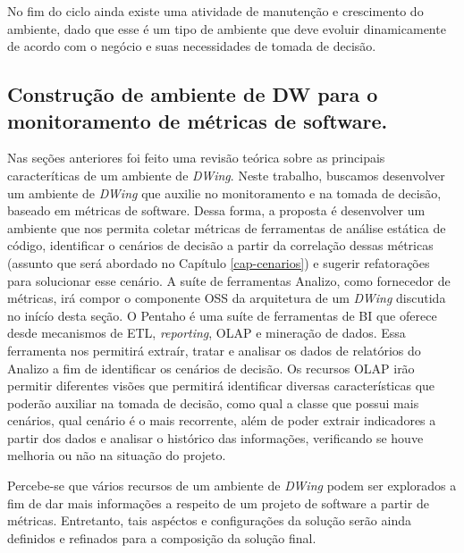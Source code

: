 No fim do ciclo ainda existe uma atividade de manutenção e crescimento do ambiente, dado que esse é um tipo de ambiente que deve evoluir dinamicamente de acordo com o negócio e suas necessidades de tomada de decisão.


\subsection{Construção de ambiente de DW para o monitoramento de métricas de software.}

%

Nas seções anteriores foi feito uma revisão teórica sobre as principais caracteríticas de um ambiente de \emph{DWing}. Neste trabalho, buscamos desenvolver um ambiente de \emph{DWing} que auxilie no monitoramento e na tomada de decisão, baseado em métricas de software. Dessa forma, a proposta é desenvolver um ambiente que nos permita coletar métricas de ferramentas de análise estática de código, identificar o cenários de decisão a partir da correlação dessas métricas (assunto que será abordado no Capítulo \ref{cap-cenarios}) e sugerir refatorações para solucionar esse cenário. A suíte de ferramentas Analizo, como fornecedor de métricas, irá compor o componente OSS da arquitetura de um \emph{DWing} discutida no inícío desta seção. O Pentaho é uma suíte de ferramentas de BI que oferece desde mecanismos de ETL, \emph{reporting}, OLAP e mineração de dados. Essa ferramenta nos permitirá extraír, tratar e analisar os dados de relatórios do Analizo a fim de identificar os cenários de decisão. Os recursos OLAP irão permitir diferentes visões que permitirá identificar diversas características que poderão auxiliar na tomada de decisão, como qual a classe que possui mais cenários, qual cenário é o mais recorrente, além de poder extrair indicadores a partir dos dados e analisar o histórico das informações, verificando se houve melhoria ou não na situação do projeto.

Percebe-se que vários recursos de um ambiente de \emph{DWing} podem ser explorados a fim de dar mais informações a respeito de um projeto de software a partir de métricas. Entretanto, tais aspéctos e configurações da solução serão ainda  definidos e refinados para a composição da solução final.

%

